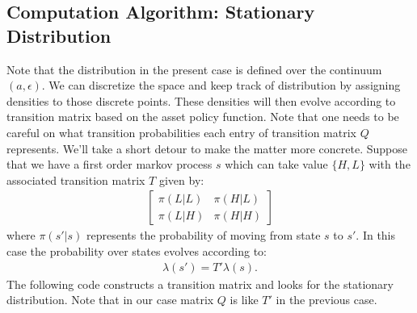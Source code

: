 \documentclass[12pt]{article}
\begin{document}
\subsection{Computation Algorithm: Stationary Distribution}
Note that the distribution in the present case is defined over the continuum $(a, \epsilon)$. We can discretize the space and keep track of distribution by assigning densities to those discrete points. These densities will then evolve according to transition matrix based on the asset policy function. Note that one needs to be careful on what transition probabilities each entry of transition matrix $Q$ represents. We'll take a short detour to make the matter more concrete. Suppose that we have a first order markov process $s$ which can take value $\{H, L\}$ with the associated transition matrix $T$ given by:
\begin{align*}
\begin{bmatrix}
\pi(L|L) & \pi(H|L) \\ \pi(L|H) & \pi(H|H)
\end{bmatrix}
\end{align*}
where $\pi(s'|s)$ represents the probability of moving from state $s$ to $s'$. In this case the probability over states evolves according to:
\begin{align*}
\lambda(s') = T' \lambda(s).
\end{align*}
The following code constructs a transition matrix and looks for the stationary distribution. Note that in our case matrix $Q$ is like $T'$ in the previous case.
\end{document}

